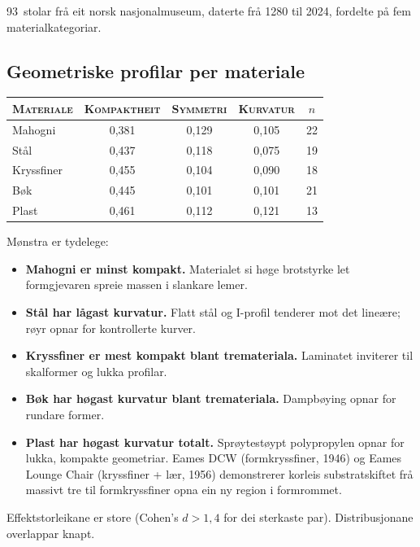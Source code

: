 93~stolar frå eit norsk nasjonalmuseum, daterte frå 1280 til 2024,
fordelte på fem materialkategoriar.

\subsection{Geometriske profilar per materiale}

\medskip
\begin{center}
{\footnotesize
\begin{tabular}{@{}lcccc@{}}
\toprule
\textsc{Materiale} & \textsc{Kompaktheit}
  & \textsc{Symmetri} & \textsc{Kurvatur} & \textsc{$n$} \\
\midrule
Mahogni    & 0{,}381 & 0{,}129 & 0{,}105 & 22 \\
Stål       & 0{,}437 & 0{,}118 & 0{,}075 & 19 \\
Kryssfiner & 0{,}455 & 0{,}104 & 0{,}090 & 18 \\
Bøk        & 0{,}445 & 0{,}101 & 0{,}101 & 21 \\
Plast      & 0{,}461 & 0{,}112 & 0{,}121 & 13 \\
\bottomrule
\end{tabular}
}
\end{center}

\medskip
Mønstra er tydelege:
\begin{itemize}[nosep]
  \item \textbf{Mahogni er minst kompakt.} Materialet si høge
    brotstyrke let formgjevaren spreie massen i slankare lemer.
  \item \textbf{Stål har lågast kurvatur.} Flatt stål og I-profil
    tenderer mot det lineære; røyr opnar for kontrollerte kurver.
  \item \textbf{Kryssfiner er mest kompakt blant tremateriala.}
    Laminatet inviterer til skalformer og lukka profilar.
  \item \textbf{Bøk har høgast kurvatur blant tremateriala.}
    Dampbøying opnar for rundare former.
  \item \textbf{Plast har høgast kurvatur totalt.}
    Sprøytestøypt polypropylen opnar for lukka, kompakte geometriar.
    Eames DCW (formkryssfiner, 1946) og Eames Lounge Chair
    (kryssfiner + lær, 1956) demonstrerer korleis substratskiftet
    frå massivt tre til formkryssfiner opna ein ny region i
    formrommet.
\end{itemize}

Effektstorleikane er store (Cohen's $d > 1{,}4$ for dei sterkaste
par). Distribusjonane overlappar knapt.

